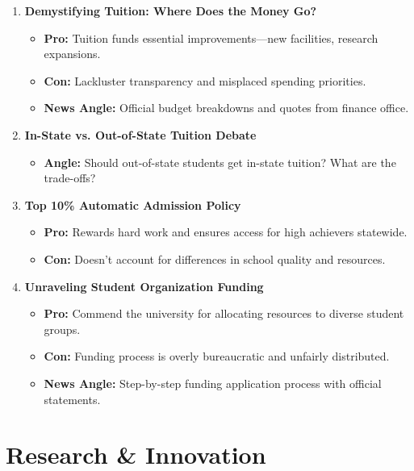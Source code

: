 \documentclass{article}
\begin{document}
\begin{enumerate}[leftmargin=*]
    \item \textbf{Demystifying Tuition: Where Does the Money Go?}
    \begin{itemize}
        \item \textbf{Pro:} Tuition funds essential improvements---new facilities, research expansions.
        \item \textbf{Con:} Lackluster transparency and misplaced spending priorities.
        \item \textbf{News Angle:} Official budget breakdowns and quotes from finance office.
    \end{itemize}

    \item \textbf{In-State vs. Out-of-State Tuition Debate}
    \begin{itemize}
        \item \textbf{Angle:} Should out-of-state students get in-state tuition? What are the trade-offs?
    \end{itemize}

    \item \textbf{Top 10\% Automatic Admission Policy}
    \begin{itemize}
        \item \textbf{Pro:} Rewards hard work and ensures access for high achievers statewide.
        \item \textbf{Con:} Doesn't account for differences in school quality and resources.
    \end{itemize}

    \item \textbf{Unraveling Student Organization Funding}
    \begin{itemize}
        \item \textbf{Pro:} Commend the university for allocating resources to diverse student groups.
        \item \textbf{Con:} Funding process is overly bureaucratic and unfairly distributed.
        \item \textbf{News Angle:} Step-by-step funding application process with official statements.
    \end{itemize}
\end{enumerate}

\section*{Research \& Innovation}
\end{document}
